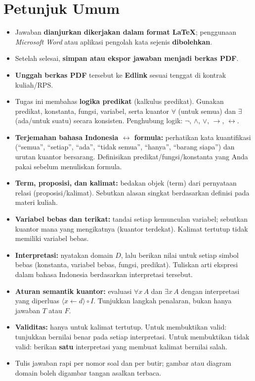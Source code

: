 \documentclass[12pt,a4paper]{article}
\theoremstyle{soaljarak}
\begin{document}
\section*{Petunjuk Umum}
\begin{itemize}[leftmargin=*]
  \item Jawaban \textbf{dianjurkan dikerjakan dalam format \LaTeX}; penggunaan \textit{Microsoft Word} atau aplikasi pengolah kata sejenis \textbf{dibolehkan}.
  \item Setelah selesai, \textbf{simpan atau ekspor jawaban menjadi berkas PDF}.
  \item \textbf{Unggah berkas PDF} tersebut ke \textbf{Edlink} sesuai tenggat di kontrak kuliah/RPS.
  \item Tugas ini membahas \textbf{logika predikat} (kalkulus predikat).
        Gunakan predikat, konstanta, fungsi, variabel, serta kuantor \(\forall\) (untuk semua) dan \(\exists\) (ada/untuk suatu) secara konsisten.
        Penghubung logik: \(\neg\), \(\wedge\), \(\vee\), \(\rightarrow\), \(\leftrightarrow\).
  \item \textbf{Terjemahan bahasa Indonesia \(\leftrightarrow\) formula:}
        perhatikan kata kuantifikasi (``semua'', ``setiap'', ``ada'', ``tidak semua'', ``hanya'', ``barang siapa'') dan urutan kuantor bersarang.
        Definisikan predikat/fungsi/konstanta yang Anda pakai sebelum menuliskan formula.
  \item \textbf{Term, proposisi, dan kalimat:}
        bedakan objek (term) dari pernyataan relasi (proposisi/kalimat).
        Sebutkan alasan singkat berdasarkan definisi pada materi kuliah.
  \item \textbf{Variabel bebas dan terikat:}
        tandai setiap kemunculan variabel; sebutkan kuantor mana yang mengikatnya (kuantor terdekat).
        Kalimat tertutup tidak memiliki variabel bebas.
  \item \textbf{Interpretasi:}
        nyatakan domain \(D\), lalu berikan nilai untuk setiap simbol bebas (konstanta, variabel bebas, fungsi, predikat).
        Tuliskan arti ekspresi dalam bahasa Indonesia berdasarkan interpretasi tersebut.
  \item \textbf{Aturan semantik kuantor:}
        evaluasi \(\forall x\,A\) dan \(\exists x\,A\) dengan interpretasi yang diperluas \(\langle x \leftarrow d \rangle \circ I\).
        Tunjukkan langkah penalaran, bukan hanya jawaban \(T\) atau \(F\).
  \item \textbf{Validitas:}
        hanya untuk kalimat tertutup.
        Untuk membuktikan valid: tunjukkan bernilai benar pada setiap interpretasi.
        Untuk membuktikan tidak valid: berikan \textbf{satu} interpretasi yang membuat kalimat bernilai salah.
  \item Tulis jawaban rapi per nomor soal dan per butir; gambar atau diagram domain boleh digambar tangan asalkan terbaca.
\end{itemize}
\end{document}
